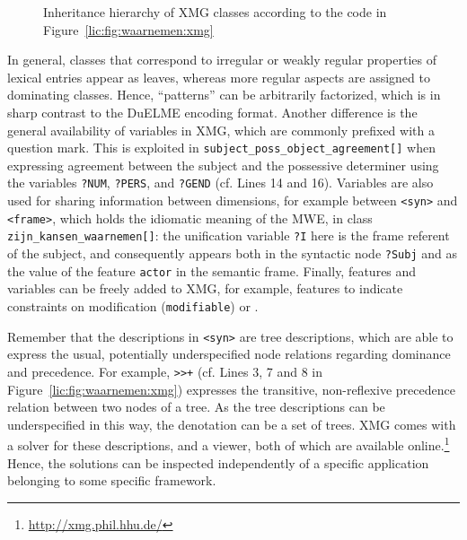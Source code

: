 \documentclass[output=paper]{langsci/langscibook}
\begin{document}
\begin{figure}
  \centering
  \caption{Inheritance hierarchy of XMG classes according to the code in Figure~\ref{lic:fig:waarnemen:xmg}}
  \label{lic:fig:waarnemen:xmg:hierarchy}
\end{figure} 

In general, classes that correspond to irregular or weakly regular properties of lexical entries appear as leaves, whereas more regular aspects are assigned to dominating classes. Hence, ``patterns'' can be arbitrarily factorized, which is in sharp contrast to the DuELME encoding format. Another difference is the general availability of variables in XMG, which are commonly prefixed with a question mark. This is exploited in \texttt{subject\_poss\_object\_agreement[]} when expressing agreement between the subject and the possessive determiner using the variables \texttt{?NUM}, \texttt{?PERS}, and \texttt{?GEND} (cf. Lines 14 and 16). Variables are also used for sharing information between dimensions, for example between \texttt{<syn>} and \texttt{<frame>}, which holds the idiomatic meaning of the MWE, in class \texttt{zijn\_kansen\_waarnemen[]}: the unification variable \texttt{?I} here is the frame referent of the subject, and consequently appears both in the syntactic node \texttt{?Subj} and as the value of the feature \texttt{actor} in the semantic frame. Finally, features and variables can be freely added to XMG, for example, features to indicate constraints on modification (\texttt{modifiable}) or .

Remember that the descriptions in \texttt{<syn>} are tree descriptions, which are able to express the usual, potentially underspecified node relations regarding dominance and precedence. For example, \texttt{>{}>+} (cf. Lines 3, 7 and 8 in Figure~\ref{lic:fig:waarnemen:xmg}) expresses the transitive, non-reflexive precedence relation between two nodes of a tree. As the tree descriptions can be underspecified in this way, the denotation can be a set of trees. XMG comes with a solver for these descriptions, and a viewer, both of which are available online.\footnote{\url{http://xmg.phil.hhu.de/}} Hence, the solutions can be inspected independently of a specific application belonging to some specific framework.
\end{document}

